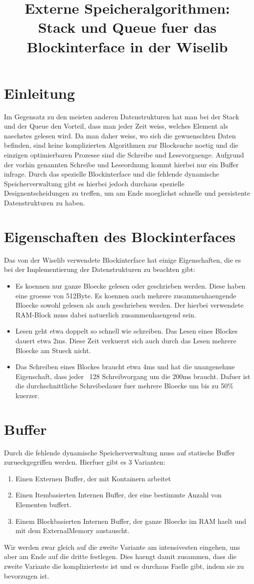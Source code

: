 \documentclass[10pt,a4paper]{article}
\begin{document}
\title{Externe Speicheralgorithmen: Stack und Queue fuer das Blockinterface in der Wiselib}
\section{Einleitung}
Im Gegensatz zu den meisten anderen Datenstrukturen hat man bei der Stack und der Queue den Vorteil, dass man jeder Zeit weiss, welches Element als naechstes gelesen wird. Da man daher weiss, wo sich die gewuenschten Daten befinden, sind keine komplizierten Algorithmen zur Blocksuche noetig und die einzigen optimierbaren Prozesse sind die Schreibe und Lesevorgaenge. Aufgrund der vorhin genannten Schreibe und Leseordnung kommt hierbei nur ein Buffer infrage. Durch das spezielle Blockinterface und die fehlende dynamische Speicherverwaltung gibt es hierbei jedoch durchaus spezielle Designentscheidungen zu treffen, um am Ende moeglichst schnelle und persistente Datenstrukturen zu haben.
\section{Eigenschaften des Blockinterfaces}
Das von der Wiselib verwendete Blockinterface hat einige Eigenschaften, die es bei der Implementierung der Datenstrukturen zu beachten gibt:
\begin{itemize}
\item Es koennen nur ganze Bloecke gelesen oder geschrieben werden. Diese haben eine groesse von 512Byte. Es koennen auch mehrere zusammenhaengende Bloecke sowohl gelesen als auch geschrieben werden. Der hierbei verwendete RAM-Block muss dabei natuerlich zusammenhaengend sein.
\item Lesen geht etwa doppelt so schnell wie schreiben. Das Lesen eines Blockes dauert etwa 2ms. Diese Zeit verkuerzt sich auch durch das Lesen mehrere Bloecke am Stueck nicht.
\item Das Schreiben eines Blockes braucht etwa 4ms und hat die unangenehme Eigenschaft, dass jeder ~128 Schreibvorgang um die 200ms braucht. Dafuer ist die durchschnittliche Schreibedauer fuer mehrere Bloecke um bis zu 50\% kuerzer.
\end{itemize} 
\section{Buffer}
Durch die fehlende dynamische Speicherverwaltung muss auf statische Buffer zurueckgegriffen werden. Hierfuer gibt es 3 Varianten:
\begin{enumerate}
\item Einen Externen Buffer, der mit Kontainern arbeitet
\item Einen Itembasierten Internen Buffer, der eine bestimmte Anzahl von Elementen buffert.
\item Einem Blockbasierten  Internen Buffer, der ganze Bloecke im RAM haelt und mit dem ExternalMemory austauscht.
\end{enumerate}
Wir werden zwar gleich auf die zweite Variante am intensivesten eingehen, uns aber am Ende auf die dritte festlegen. Dies haengt damit zusammen, dass die zweite Variante die komplizierteste ist und es durchaus Faelle gibt, indem sie zu bevorzugen ist. 
\end{document}
